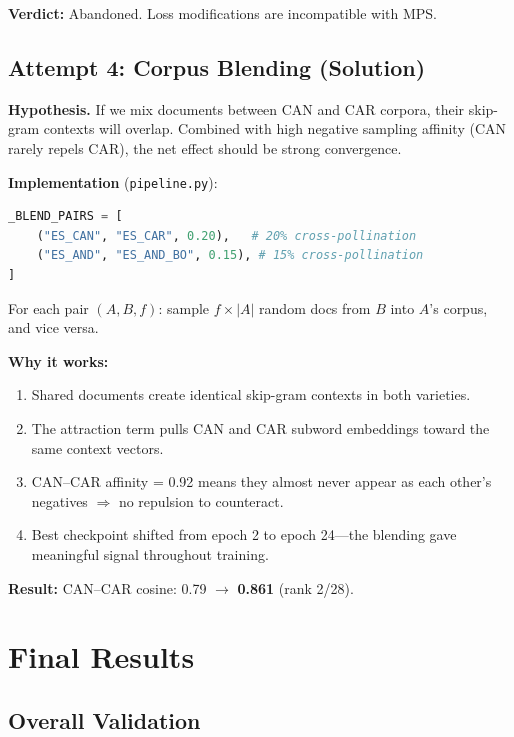 \documentclass[11pt,a4paper]{article}
\begin{document}
\textbf{Verdict:} \colorbox{red!10}{Abandoned.} Loss modifications are incompatible with MPS.

\subsection{Attempt 4: Corpus Blending (Solution)}
\label{sec:blending}

\textbf{Hypothesis.} If we mix documents between CAN and CAR corpora, their skip-gram contexts will overlap. Combined with high negative sampling affinity (CAN rarely repels CAR), the net effect should be strong convergence.

\textbf{Implementation} (\texttt{pipeline.py}):

\begin{lstlisting}[language=Python]
_BLEND_PAIRS = [
    ("ES_CAN", "ES_CAR", 0.20),   # 20% cross-pollination
    ("ES_AND", "ES_AND_BO", 0.15), # 15% cross-pollination
]
\end{lstlisting}

For each pair $(A, B, f)$: sample $f \times |A|$ random docs from $B$ into $A$'s corpus, and vice versa.

\textbf{Why it works:}
\begin{enumerate}[nosep]
\item Shared documents create identical skip-gram contexts in both varieties.
\item The attraction term pulls CAN and CAR subword embeddings toward the same context vectors.
\item CAN--CAR affinity = 0.92 means they almost never appear as each other's negatives $\Rightarrow$ no repulsion to counteract.
\item Best checkpoint shifted from epoch 2 to epoch 24---the blending gave meaningful signal throughout training.
\end{enumerate}

\textbf{Result:} \colorbox{green!15}{CAN--CAR cosine: 0.79 $\to$ \textbf{0.861} (rank 2/28).}

\section{Final Results}

\subsection{Overall Validation}
\end{document}
